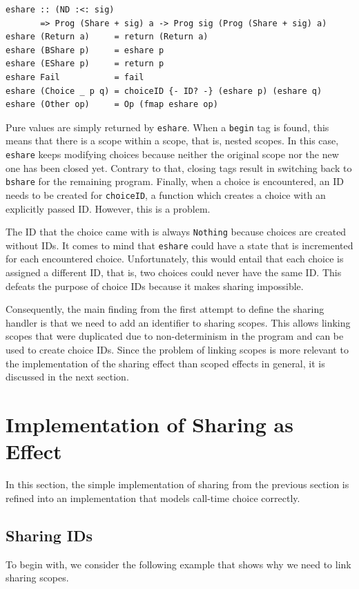 \documentclass[a4paper, 11pt, fleqn, twoside, abstract=on]{scrreprt}
\newcommand{\hinl}[1]{\texttt{#1}}
\begin{document}
\begin{verbatim}
eshare :: (ND :<: sig)
       => Prog (Share + sig) a -> Prog sig (Prog (Share + sig) a)
eshare (Return a)     = return (Return a)
eshare (BShare p)     = eshare p
eshare (EShare p)     = return p
eshare Fail           = fail
eshare (Choice _ p q) = choiceID {- ID? -} (eshare p) (eshare q)
eshare (Other op)     = Op (fmap eshare op)
\end{verbatim}
\noindent
Pure values are simply returned by \hinl{eshare}.
When a \hinl{begin} tag is found, this means that there is a scope within a scope, that is, nested scopes.
In this case, \hinl{eshare} keeps modifying choices because neither the original scope nor the new one has been closed yet.
Contrary to that, closing tags result in switching back to \hinl{bshare} for the remaining program.
Finally, when a choice is encountered, an ID needs to be created for  \hinl{choiceID}, a function which creates a choice with an explicitly passed ID.
However, this is a problem.

The ID that the choice came with is always \hinl{Nothing} because choices are created without IDs.
It comes to mind that \hinl{eshare} could have a state that is incremented for each encountered choice.
Unfortunately, this would entail that each choice is assigned a different ID, that is, two choices could never have the same ID.
This defeats the purpose of choice IDs because it makes sharing impossible.

Consequently, the main finding from the first attempt to define the sharing handler is that we need to add an identifier to sharing scopes.
This allows linking scopes that were duplicated due to non-determinism in the program and can be used to create choice IDs.
Since the problem of linking scopes is more relevant to the implementation of the sharing effect than scoped effects in general, it is discussed in the next section.

\section{Implementation of Sharing as Effect}
\label{subsec:sharingImplementation}
In this section, the simple implementation of sharing from the previous section is refined into an implementation that models call-time choice correctly.

\subsection{Sharing IDs}
To begin with, we consider the following example that shows why we need to link sharing scopes.
\end{document}
